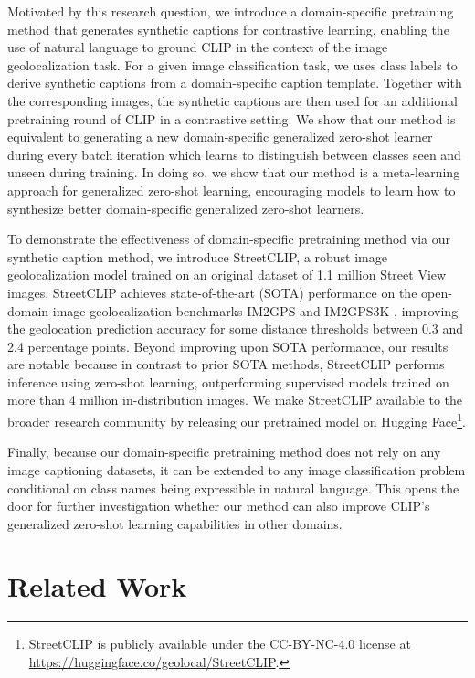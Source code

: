 \documentclass{article}
\renewcommand{\cite}[1]{\citep{#1}}
\begin{document}
Motivated by this research question, we introduce a domain-specific pretraining method that generates synthetic captions for contrastive learning, enabling the use of natural language to ground CLIP in the context of the image geolocalization task. For a given image classification task, we uses class labels to derive synthetic captions from a domain-specific caption template. Together with the corresponding images, the synthetic captions are then used for an additional pretraining round of CLIP in a contrastive setting. We show that our method is equivalent to generating a new domain-specific generalized zero-shot learner during every batch iteration which learns to distinguish between classes seen and unseen during training. In doing so, we show that our method is a meta-learning approach for generalized zero-shot learning, encouraging models to learn how to synthesize better domain-specific generalized zero-shot learners.

To demonstrate the effectiveness of domain-specific pretraining method via our synthetic caption method, we introduce StreetCLIP, a robust image geolocalization model trained on an original dataset of 1.1 million Street View images. StreetCLIP achieves state-of-the-art (SOTA) performance on the open-domain image geolocalization benchmarks IM2GPS \cite{hays_2008} and IM2GPS3K \cite{vo_et_al}, improving the geolocation prediction accuracy for some distance thresholds between 0.3 and 2.4 percentage points. Beyond improving upon SOTA performance, our results are notable because in contrast to prior SOTA methods, StreetCLIP performs inference using zero-shot learning, outperforming supervised models trained on more than 4 million in-distribution images. We make StreetCLIP available to the broader research community by releasing our pretrained model on Hugging Face\footnote{StreetCLIP is publicly available under the CC-BY-NC-4.0 license at \href{https://huggingface.co/geolocal/StreetCLIP}{https://huggingface.co/geolocal/StreetCLIP}.}.

Finally, because our domain-specific pretraining method does not rely on any image captioning datasets, it can be extended to any image classification problem conditional on class names being expressible in natural language. This opens the door for further investigation whether our method can also improve CLIP's generalized zero-shot learning capabilities in other domains. 

\section{Related Work}
\end{document}

